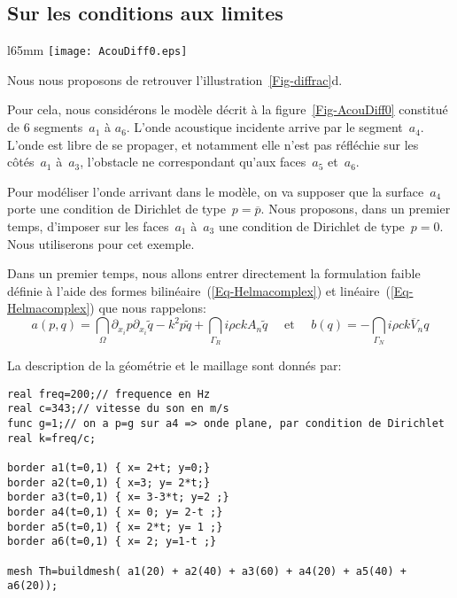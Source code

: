 \medskip\ifVersionDuDocEstVincent\newpage\fi
\subsection{Sur les conditions aux limites}

\begin{wrapfigure}{l}{65mm}
\centering
\texttt{[image: AcouDiff0.eps]}
\caption{Acoustique et obstacle}\label{Fig-AcouDiff0}
\end{wrapfigure}
Nous nous proposons de retrouver l'illustration~\ref{Fig-diffrac}d.

Pour cela, nous considérons le modèle décrit à la figure~\ref{Fig-AcouDiff0} constitué de 6 segments~$a_1$ à $a_6$. L'onde acoustique incidente arrive par le segment~$a_4$. L'onde est libre de se propager, et notamment elle n'est pas réfléchie sur les côtés~$a_1$ à~$a_3$, l'obstacle ne correspondant qu'aux faces~$a_5$ et~$a_6$.

Pour modéliser l'onde arrivant dans le modèle, on va supposer que la surface~$a_4$ porte une condition de Dirichlet de type~$p=\overline{p}$.
Nous proposons, dans un premier temps, d'imposer sur les faces~$a_1$ à~$a_3$ une condition de Dirichlet de type~$p=0$.
Nous utiliserons \freefem pour cet exemple.

Dans un premier temps, nous allons entrer directement la formulation faible définie à l'aide des formes bilinéaire~(\ref{Eq-Helmacomplex}) et linéaire~(\ref{Eq-Helmacomplex}) que nous rappelons:
\begin{equation}\label{Eq-Helmab}
a(p,q)=\dint_\Omega \partial_{x_i}p\partial_{x_i}\tilde{q}-k^2p\tilde{q} +
\dint_{\Gamma_R} i\rho ckA_n\tilde{q}
\quad \text{ et } \quad
b(q)=-\dint_{\Gamma_N} i\rho c k\overline{V}_n q
\end{equation}

\medskip
La description de la géométrie et le maillage sont donnés par:
\lstset{language=freefem++}
\begin{lstlisting}
real freq=200;// frequence en Hz
real c=343;// vitesse du son en m/s
func g=1;// on a p=g sur a4 => onde plane, par condition de Dirichlet
real k=freq/c;

border a1(t=0,1) { x= 2+t; y=0;}
border a2(t=0,1) { x=3; y= 2*t;}
border a3(t=0,1) { x= 3-3*t; y=2 ;}
border a4(t=0,1) { x= 0; y= 2-t ;}
border a5(t=0,1) { x= 2*t; y= 1 ;}
border a6(t=0,1) { x= 2; y=1-t ;}

mesh Th=buildmesh( a1(20) + a2(40) + a3(60) + a4(20) + a5(40) + a6(20));
\end{lstlisting}

